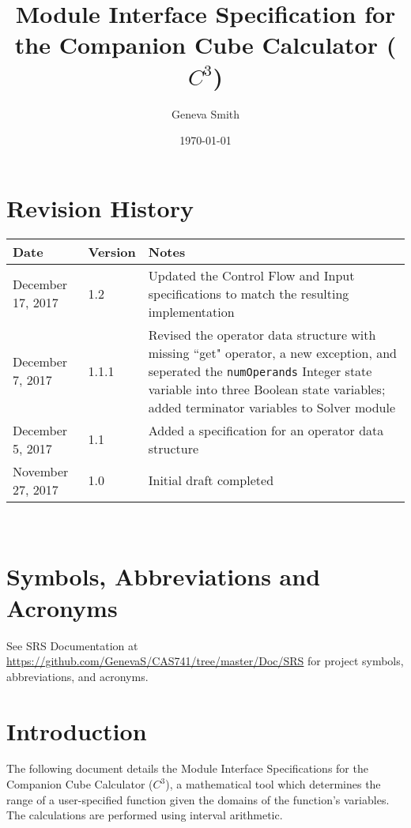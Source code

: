\documentclass[12pt, titlepage]{article}
\newcommand{\progname}{Companion Cube Calculator}
\newcommand{\prognameAbbrv}{$C^{3}$}
\begin{document}
\title{Module Interface Specification for the \progname{} (\prognameAbbrv{})}

\author{Geneva Smith}

\date{\today}

\maketitle


\section{Revision History}

\begin{tabularx}{\textwidth}{p{3cm}p{2cm}X}
\toprule {\bf Date} & {\bf Version} & {\bf Notes}\\
\midrule
December 17, 2017 & 1.2 & Updated the Control Flow and Input specifications to 
match the resulting implementation \\
December 7, 2017 & 1.1.1 & Revised the operator data structure with missing 
``get" operator, a new exception, and seperated the \texttt{numOperands} 
Integer state variable into three Boolean state variables; added terminator 
variables to Solver module\\
December 5, 2017 & 1.1 & Added a specification for an operator data structure \\
November 27, 2017 & 1.0 & Initial draft completed\\
\bottomrule
\end{tabularx}

~\newpage

\section{Symbols, Abbreviations and Acronyms}

See SRS Documentation at 
\url{https://github.com/GenevaS/CAS741/tree/master/Doc/SRS} for project 
symbols, abbreviations, and acronyms.

\newpage

\tableofcontents

\newpage


\section{Introduction}
The following document details the Module Interface Specifications for the 
\progname{} (\prognameAbbrv{}), a mathematical tool which determines the range 
of a user-specified function given the domains of the function's variables. The 
calculations are performed using interval arithmetic.
\end{document}
